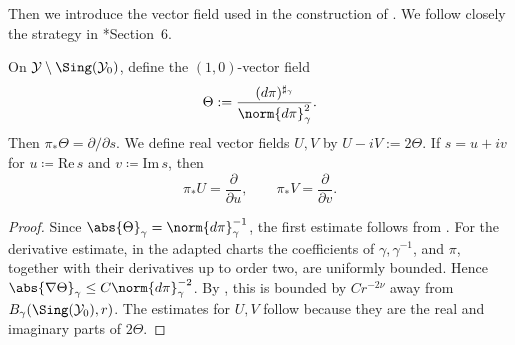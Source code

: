 \documentclass[12pt]{amsart}
\begin{document}
Then we introduce the vector field used in the construction of . We follow
closely the strategy in \cite{Dai-Yoshikawa2025}*{Section~6}.

On \(\mathcal{Y}\setminus \Sing(\mathcal{Y}_{0})\), define the \((1,0)\)-vector field
\[
\Theta:=\frac{(d\pi)^{\sharp_{\gamma}}}{\norm{d\pi}_{\gamma}^{2}} .
\]
Then \(\pi_{*}\Theta=\partial/\partial s\). We define real vector fields \(U,V\) by
\(U-iV:=2\Theta\). If \(s=u+iv\) for $u \coloneqq \mathrm{Re}\,s$
and $v \coloneqq \mathrm{Im}\,s$, then
\[
\pi_{*}U=\frac{\partial}{\partial u},
\qquad
\pi_{*}V=\frac{\partial}{\partial v}.
\]


\begin{proof}
Since \(\abs{\Theta}_{\gamma}=\norm{d\pi}_{\gamma}^{-1}\), the first estimate follows from
. For the derivative estimate, in the adapted charts the coefficients of
\(\gamma,\gamma^{-1}\), and \(\pi\), together with their derivatives up to order two, are uniformly bounded.
Hence \(\abs{\nabla\Theta}_{\gamma}\leq C\norm{d\pi}_{\gamma}^{-2}\). By
, this is bounded by \(Cr^{-2\nu}\) away from
\(B_{\gamma}(\Sing(\mathcal{Y}_{0}),r)\). The estimates for \(U,V\) follow because they are the real and
imaginary parts of \(2\Theta\).
\end{proof}
\end{document}
